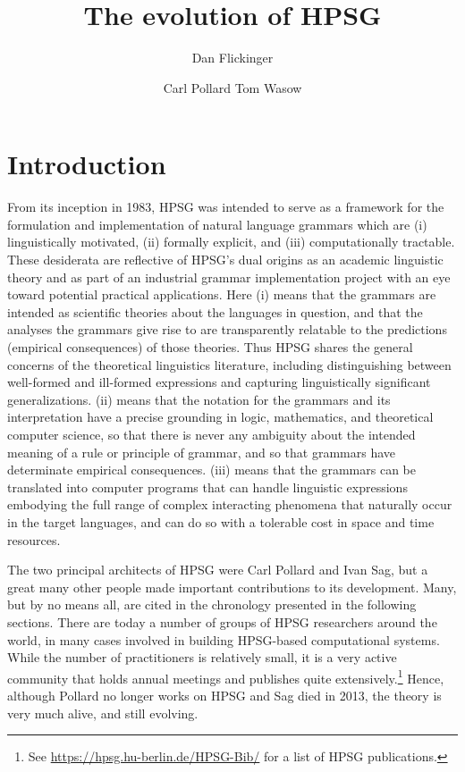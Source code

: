 \documentclass[output=paper
 	        ,biblatex
                ,babelshorthands
                ,newtxmath
                ,draftmode
                ,colorlinks, citecolor=brown
]{langscibook}
\title{The evolution of HPSG}
\author{%
	Dan Flickinger\affiliation{Stanford University}%
	\and Carl Pollard\affiliation{Ohio State Universitiy}
	\lastand Tom Wasow\affiliation{Stanford University}%
}
\begin{document}
\maketitle
\label{chap-evolution}


\section{Introduction} 

From its inception in 1983, HPSG was intended to serve as a framework for the formulation and implementation of natural language grammars which are (i) linguistically motivated, (ii) formally explicit, and (iii) computationally tractable. These desiderata are reflective of HPSG's dual origins as an academic linguistic theory and as part of an industrial grammar implementation project with an eye toward potential practical applications. Here (i) means that the grammars are intended as scientific theories about the languages in question, and that the analyses the grammars give rise to are transparently relatable to the predictions (empirical consequences) of those theories. Thus HPSG shares the general concerns of the theoretical linguistics literature, including distinguishing between well-formed and ill-formed expressions and capturing linguistically significant generalizations.  (ii) means that the notation for the grammars and its interpretation have a precise grounding in logic, mathematics, and theoretical computer science, so that there is never any ambiguity about the intended meaning of a rule or principle of grammar, and so that grammars have determinate empirical consequences. (iii) means that the grammars can be translated into computer programs that can handle linguistic expressions embodying the full range of complex interacting phenomena that naturally occur in the target languages, and can do so with a tolerable cost in space and time resources.

The two principal architects of HPSG were Carl Pollard and Ivan
Sag, but a great many other people made important contributions to its
development.  Many, but by no means all, are cited in the chronology presented in the following
sections.  There are today a number of groups of HPSG researchers around the world, in many cases
involved in building HPSG-based computational systems.  While the number of practitioners is
relatively small, it is a very active community that holds annual meetings and publishes quite
extensively.\footnote{See \url{https://hpsg.hu-berlin.de/HPSG-Bib/} for a list of HPSG
    publications.} Hence, although Pollard no longer works on HPSG and Sag died in 2013, the theory
is very much alive, and still evolving.
\end{document}
